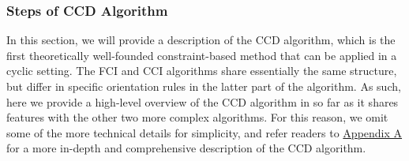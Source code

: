 \documentclass[twoside, 11pt]{article}
\newcommand{\udot}[1]{%
    \tikz[baseline=(todotted.base)]{
        \node[inner sep=1pt,outer sep=0pt] (todotted) {#1};
        \draw[dotted, thick] (todotted.south west) -- (todotted.south east);
    }%
}%
\newcommand{\starstar}{%
\begin{tikzpicture}[baseline=-3pt]
    \draw [{Rays[n=6]}-{Rays[n=6]}] (0,0) -- (0.55,0);
\end{tikzpicture}
}
\newcommand{\circstar}{%
\begin{tikzpicture}
    \draw [{Circle[open]}-{Rays[n=6]}] (0,0) -- (0.55, 0);
\end{tikzpicture}
}
\newcommand{\tailarrow}{%
\begin{tikzpicture}
    \draw [-{Straight Barb[length=2.5pt]}](0,0) -- (0.4, 0);
\end{tikzpicture}
}
\newcommand{\arrowtail}{%
\begin{tikzpicture}
    \draw [{Straight Barb[length=2.5pt]}-](0,0) -- (0.4, 0);
\end{tikzpicture}
}
\begin{document}

    

\subsubsection{Steps of CCD Algorithm}
In this section, we will provide a description of the CCD algorithm, which is the first theoretically well-founded constraint-based method that can be applied in a cyclic setting. The FCI and CCI algorithms share essentially the same structure, but differ in specific orientation rules in the latter part of the algorithm. As such, here we provide a high-level overview of the CCD algorithm in so far as it shares features with the other two more complex algorithms. For this reason, we omit some of the more technical details for simplicity, and refer readers to \hyperref[algCCD]{Appendix A} for a more in-depth and comprehensive description of the CCD algorithm.

\end{document}

